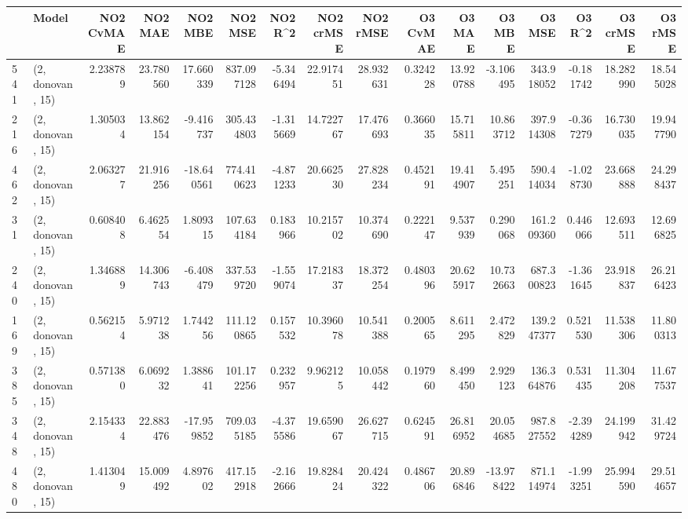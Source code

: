 \begin{tabular}{llrrrrrrrrrrrrrr}
\toprule
{} &             Model &  NO2 CvMAE &    NO2 MAE &    NO2 MBE &      NO2 MSE &    NO2 R\textasciicircum2 &  NO2 crMSE &   NO2 rMSE &  O3 CvMAE &     O3 MAE &     O3 MBE &        O3 MSE &     O3 R\textasciicircum2 &    O3 crMSE &     O3 rMSE \\
\midrule
541 &  (2, donovan, 15) &   2.238789 &  23.780560 &  17.660339 &   837.097128 &  -5.346494 &  22.917451 &  28.932631 &  0.324228 &  13.920788 &  -3.106495 &    343.918052 &  -0.181742 &   18.282990 &   18.545028 \\
216 &  (2, donovan, 15) &   1.305034 &  13.862154 &  -9.416737 &   305.434803 &  -1.315669 &  14.722767 &  17.476693 &  0.366035 &  15.715811 &  10.863712 &    397.914308 &  -0.367279 &   16.730035 &   19.947790 \\
462 &  (2, donovan, 15) &   2.063277 &  21.916256 & -18.640561 &   774.410623 &  -4.871233 &  20.662530 &  27.828234 &  0.452191 &  19.414907 &   5.495251 &    590.414034 &  -1.028730 &   23.668888 &   24.298437 \\
31  &  (2, donovan, 15) &   0.608408 &   6.462554 &   1.809315 &   107.634184 &   0.183966 &  10.215702 &  10.374690 &  0.222147 &   9.537939 &   0.290068 &    161.209360 &   0.446066 &   12.693511 &   12.696825 \\
240 &  (2, donovan, 15) &   1.346889 &  14.306743 &  -6.408479 &   337.539720 &  -1.559074 &  17.218337 &  18.372254 &  0.480396 &  20.625917 &  10.732663 &    687.300823 &  -1.361645 &   23.918837 &   26.216423 \\
169 &  (2, donovan, 15) &   0.562154 &   5.971238 &   1.744256 &   111.120865 &   0.157532 &  10.396078 &  10.541388 &  0.200565 &   8.611295 &   2.472829 &    139.247377 &   0.521530 &   11.538306 &   11.800313 \\
385 &  (2, donovan, 15) &   0.571380 &   6.069232 &   1.388641 &   101.172256 &   0.232957 &   9.962125 &  10.058442 &  0.197960 &   8.499450 &   2.929123 &    136.364876 &   0.531435 &   11.304208 &   11.677537 \\
348 &  (2, donovan, 15) &   2.154334 &  22.883476 & -17.959852 &   709.035185 &  -4.375586 &  19.659067 &  26.627715 &  0.624591 &  26.816952 &  20.054685 &    987.827552 &  -2.394289 &   24.199942 &   31.429724 \\
480 &  (2, donovan, 15) &   1.413049 &  15.009492 &   4.897602 &   417.152918 &  -2.162666 &  19.828424 &  20.424322 &  0.486706 &  20.896846 & -13.978422 &    871.114974 &  -1.993251 &   25.994590 &   29.514657 \\

\end{tabular}
